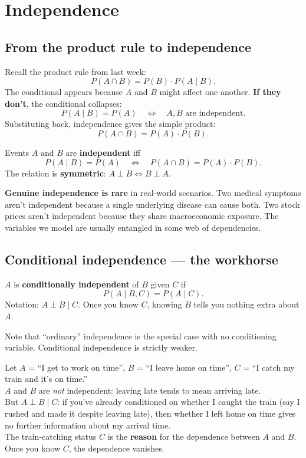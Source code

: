 \documentclass[11pt, a4paper]{article}
\begin{document}
\section{Independence}

\subsection{From the product rule to independence}

Recall the product rule from last week:
\[
P(A \cap B) = P(B) \cdot P(A \mid B).
\]
The conditional appears because $A$ and $B$ might affect one another. \textbf{If they don't}, the conditional collapses:
\[
P(A \mid B) = P(A) \quad \Longleftrightarrow \quad A, B \text{ are independent}.
\]
Substituting back, independence gives the simple product:
\[
P(A \cap B) = P(A) \cdot P(B).
\]

\begin{defbox}[Independence]
Events $A$ and $B$ are \textbf{independent} iff
\[
P(A \mid B) = P(A) \quad \Longleftrightarrow \quad P(A \cap B) = P(A) \cdot P(B).
\]
The relation is \textbf{symmetric}: $A \perp B \iff B \perp A$.
\end{defbox}

\textbf{Genuine independence is rare} in real-world scenarios. Two medical symptoms aren't independent because a single underlying disease can cause both. Two stock prices aren't independent because they share macroeconomic exposure. The variables we model are usually entangled in some web of dependencies.

\subsection{Conditional independence — the workhorse}

\begin{defbox}
$A$ is \textbf{conditionally independent} of $B$ given $C$ if
\[
P(A \mid B, C) = P(A \mid C).
\]
Notation: $A \perp B \mid C$. Once you know $C$, knowing $B$ tells you nothing extra about $A$.
\end{defbox}

Note that ``ordinary'' independence is the special case with no conditioning variable. Conditional independence is strictly weaker.

\begin{exbox}
Let $A$ = ``I get to work on time'', $B$ = ``I leave home on time'', $C$ = ``I catch my train and it's on time.''\\[0.3em]
$A$ and $B$ are \emph{not} independent: leaving late tends to mean arriving late.\\[0.3em]
But $A \perp B \mid C$: if you've already conditioned on whether I caught the train (say I rushed and made it despite leaving late), then whether I left home on time gives no further information about my arrival time.\\[0.3em]
The train-catching status $C$ is the \textbf{reason} for the dependence between $A$ and $B$. Once you know $C$, the dependence vanishes.
\end{exbox}
\end{document}
